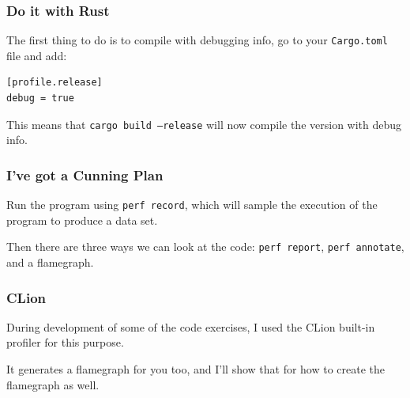 \begin{frame}[fragile]
\frametitle{Do it with Rust}

The first thing to do is to compile with debugging info, go to your \texttt{Cargo.toml} file and add:
\begin{verbatim}
[profile.release]
debug = true
\end{verbatim}

This means that \texttt{cargo build --release} will now compile the version with debug info.

\end{frame}

\begin{frame}
\frametitle{I've got a Cunning Plan}

Run the program using \texttt{perf record}, which will sample the execution of the program to produce a data set.


Then there are three ways we can look at the code: \texttt{perf report}, \texttt{perf annotate}, and a flamegraph.

\end{frame}


\begin{frame}
\frametitle{CLion}

During development of some of the code exercises, I used the CLion built-in profiler for this purpose. 

It generates a flamegraph for you too, and I'll show that for how to create the flamegraph as well.


\end{frame}





